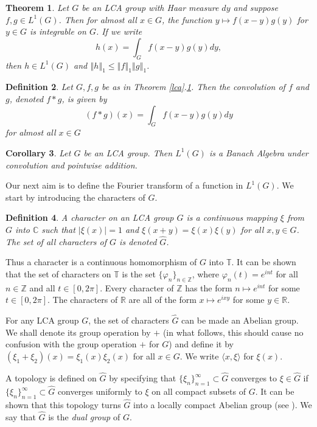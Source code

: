 \documentclass[mmath,12pt]{unswthesis}   %
\newcommand{\R}{\mathbb{R}}
\newcommand{\C}{\mathbb{C}}
\newcommand{\T}{\mathbb{T}}
\newcommand{\Z}{\mathbb{Z}}
\newcommand{\hatt}[1]{\widehat #1}
\newcommand{\reff}[2]{\ref{#1}.\ref{#2}}
\def\ip<#1,#2>{\langle #1,#2 \rangle}
\def\norm#1{\left \Vert #1 \right \Vert}
\newtheorem{theorem}{Theorem}[section]
\newtheorem{corollary}[theorem]{Corollary}
\newtheorem{definition}[theorem]{Definition}
\numberwithin{equation}{section}
\begin{document}
\begin{theorem}\label{convolution}
Let $G$ be an LCA group with Haar measure $dy$
and suppose $f,g\in L^1(G)$. Then for almost all $x\in G$, the function
$y\mapsto f(x-y)g(y)$ for $y\in G$ is integrable on $G$.
If we write 
\[h(x)=\int_G f(x-y)g(y)dy,\]
then $h\in L^1(G)$ and $\norm{h}_1\leq\norm{f}_1\norm{g}_1$.
\end{theorem}

\begin{definition} Let $G,f,g$ be as in Theorem \reff{lca}{convolution}. Then
the {\em convolution} of $f$ and $g$, denoted $f*g$, is given by
\[(f*g)(x)=\int_G f(x-y)g(y)dy\]
for almost all $x\in G$
\end{definition}

\begin{corollary} Let $G$ be an LCA group. Then $L^1(G)$ is a
Banach Algebra under convolution and pointwise addition.
\end{corollary}

Our next aim is to define the Fourier transform of a function in $L^1(G)$.
We start by introducing the characters of $G$.

\begin{definition} A {\em character} on an LCA group $G$ is a continuous mapping
$\xi$ from $G$ into $\C$ such that $|\xi(x)|=1$
and $\xi(x+y)=\xi(x)\xi(y)$ for all $x,y\in G$. The set of all characters of
$G$ is denoted $\hatt{G}$.
\end{definition}

Thus a character is a continuous homomorphism of $G$ into $\T$. It can be shown
that the set of characters on $\T$ is the set $\{\varphi_n\}_{n\in\Z}$, where
$\varphi_n(t)=e^{int}$ for all $n\in\Z$ and all $t\in[0,2\pi]$. Every character
of
$\Z$ has the form $n\mapsto e^{int}$ for some $t\in[0,2\pi]$. The characters of
$\R$ are all of the form $x\mapsto e^{ixy}$ for some $y\in\R$.

For any LCA group $G$, the set of characters $\hatt{G}$ can be made 
an Abelian group. We shall denote its group operation by $+$ (in what follows, 
this should cause no confusion with the group operation $+$ for $G$) and
define it by $(\xi_1+\xi_2)(x)=\xi_1(x)\xi_2(x)$ for all $x\in G$.
We write $\ip<x,\xi>$ for $\xi(x)$.

A topology is defined on $\hatt{G}$ by specifying that
$\{\xi_n\}_{n=1}^{\infty}\subset\hatt{G}$ converges to $\xi\in\hatt{G}$ if
$\{\xi_n\}_{n=1}^{\infty}\subset\hatt{G}$ converges uniformly to $\xi$ on all
compact subsets of $G$. It can be shown that this topology turns $\hatt{G}$ into
a locally compact Abelian group (see \cite[Chapter VII, \S 3]{Katznelson}).
We say that $\hatt{G}$ is the {\em dual group}
of $G$.
\end{document}
